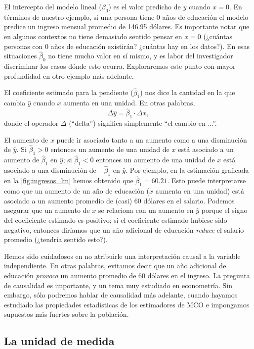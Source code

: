 \documentclass[12pt]{report}\usepackage[]{graphicx}\usepackage[]{color}
\begin{document}
El intercepto del modelo lineal ($\beta_0$) es el valor predicho de $y$ cuando $x=0$. En términos de nuestro ejemplo, si una persona tiene 0 años de educación el modelo predice un ingreso mensual promedio de 146.95 dólares.
Es importante notar que en algunos contextos no tiene demasiado sentido pensar en $x=0$ (¿cuántas personas con 0 años de educación existirán? ¿cuántas hay en los datos?). En esas situaciones $\hat\beta_0$ no tiene mucho valor en sí mismo, y es labor del investigador discriminar los casos dónde esto ocurra.
Exploraremos este punto con mayor profundidad en otro ejemplo más adelante.

El coeficiente estimado para la pendiente ($\hat\beta_1$) nos dice la cantidad en la que cambia $\hat y$ cuando $x$ aumenta en una unidad. En otras palabras,
\begin{equation}
\Delta \hat y = \hat \beta_1 \cdot \Delta x,
\end{equation}
donde el operador $\Delta$ (``delta'') significa simplemente ``el cambio en ...''.

El aumento de $x$ puede ir asociado tanto a un aumento como a una disminución de $\hat y$.
Si $\hat\beta_1 > 0$ entonces un aumento de una unidad de $x$ está asociado a un aumento de $\hat\beta_1$ en $\hat y$; si $\hat\beta_1 < 0$ entonces un aumento de una unidad de $x$ está asociado a una disminución de $-\hat\beta_1$ en $\hat y$.
Por ejemplo, en la estimación graficada en la \autoref{fig:ingresos_lm} hemos obtenido que $\hat\beta_1 = 60.21$.
Esto puede interpretarse como que un aumento de un año de educación ($x$ aumenta en una unidad) está asociado a un aumento promedio de (casi) 60 dólares en el salario.
Podemos asegurar que un aumento de $x$ se relaciona con un aumento en $\hat y$ porque el signo del coeficiente estimado es positivo; si el coeficiente estimado hubiese sido negativo, entonces diríamos que un año adicional de educación \emph{reduce} el salario promedio (¿tendría sentido esto?).

Hemos sido cuidadosos en no atribuirle una interpretación causal a la variable independiente. En otras palabras, evitamos decir que un año adicional de educación \emph{provoca} un aumento promedio de 60 dólares en el ingreso. La pregunta de causalidad es importante, y un tema muy estudiado en econometría. Sin embargo, sólo podremos hablar de causalidad más adelante, cuando hayamos estudiado las propiedades estadísticas de los estimadores de MCO e impongamos supuestos más fuertes sobre la población.

\subsection{La unidad de medida}
\end{document}
